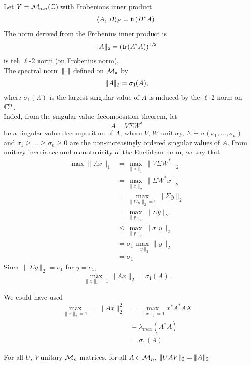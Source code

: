 \documentclass[aspectratio=169]{beamer}
\begin{document}
\begin{frame}
Let $V = \mathcal{M}_{mn}(\mathbb{C})$ with Frobenious inner product 
\[\langle A, \, B \rangle_{F}= \mathsf{tr}(B^*A).\]
The norm derived from the Frobenius inner product is 
\[\|A\|_2= (\mathsf{tr}(A^*A))^{1/2}\]
is teh $\ell$-2 norm (on Frobenius norm).\\

The spectral norm $\left|\!\left|\!\left|\cdot\right|\!\right|\!\right|$ defined on $\mathcal{M}_n$ by 
\[|\! |\! | A|\! |\! |_2= \sigma_1(A),\]
where $\sigma_1(A)$ is the largest singular value of $A$ is induced by the $\ell$-2 norm on $\mathbb{C}^n$. \\
Inded, from the singular value decomposition theorem, let 
\[A= V \Sigma W^*\]
be a singular value decomposition of $A$, where $V, \, W$ unitary, $\Sigma= \sigma(\sigma_1, \dots, \sigma_n)$ and $\sigma_1 \geq \dots \geq \sigma_n\geq 0$ are the non-increasingly ordered singular values of $A$. From unitary invariance and monotonicity of the Euclidean norm, we say that 
\begin{align*}
\max \|Ax\|_1&= \max_{\|x\|_1} \|V\Sigma W^*\|_2\\
&= \max_{\|x\|_2} \|\Sigma W^* x\|_2\\
&= \max_{\|Wy\|_2=1}\|\Sigma y\|_2\\
&= \max_{\|y\|_2}\|\Sigma y\|_2\\
& \leq \max_{\|y\|_2}\|\sigma_1 y\|_2\\
&= \sigma_1 \max_{\| y \|_2} \|y\|_2\\
&= \sigma_1
\end{align*}
Since $\| \Sigma y\|_2= \sigma_1$ for $y= e_1$, 
\[\max_{\|x\|_2=1} \|Ax\|_2= \sigma_1(A).\]

We could have used 
\begin{align*}
\max_{\|x\|_2=1}=\|Ax\|_2^2&= \max_{\|x\|_2=1}x^*A^*AX\\
&= \lambda_{max}(A^*A)\\
&= \sigma_1(A)
\end{align*}


\begin{remark}
	For all $U,\, V$ unitary $\mathcal{M}_{n}$ matrices, for all $A\in \mathcal{M}_n$, $\tripbar UAV\tripbar_2= \tripbar A\tripbar_2$
\end{remark}
\end{frame}
\end{document}
